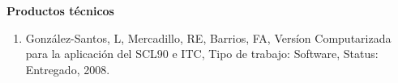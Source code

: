 {\large \textbf{Productos técnicos}}

\begin{enumerate}

\item González-Santos, L, Mercadillo, RE, Barrios, FA, Versíon Computarizada para la aplicación del SCL90 e 
ITC, 
Tipo de trabajo: Software, Status: Entregado, 2008.

\end{enumerate}

